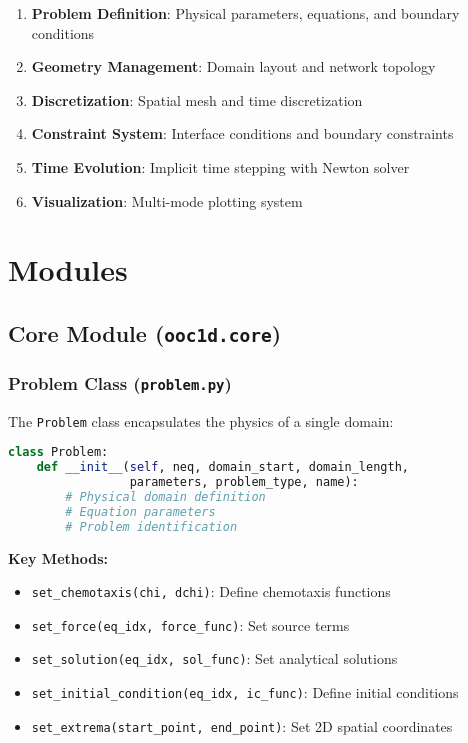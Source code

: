 \documentclass[11pt,a4paper]{article}
\newcommand{\code}[1]{\texttt{#1}}
\begin{document}
\begin{enumerate}
    \item \textbf{Problem Definition}: Physical parameters, equations, and boundary conditions
    \item \textbf{Geometry Management}: Domain layout and network topology
    \item \textbf{Discretization}: Spatial mesh and time discretization 
    \item \textbf{Constraint System}: Interface conditions and boundary constraints
    \item \textbf{Time Evolution}: Implicit time stepping with Newton solver
    \item \textbf{Visualization}: Multi-mode plotting system
\end{enumerate}

\section{Modules}

\subsection{Core Module (\code{ooc1d.core})}

\subsubsection{Problem Class (\code{problem.py})}

The \code{Problem} class encapsulates the physics of a single domain:

\begin{lstlisting}[language=Python, caption={Problem Class Structure}]
class Problem:
    def __init__(self, neq, domain_start, domain_length, 
                 parameters, problem_type, name):
        # Physical domain definition
        # Equation parameters
        # Problem identification
\end{lstlisting}

\textbf{Key Methods:}
\begin{itemize}
    \item \code{set\_chemotaxis(chi, dchi)}: Define chemotaxis functions
    \item \code{set\_force(eq\_idx, force\_func)}: Set source terms
    \item \code{set\_solution(eq\_idx, sol\_func)}: Set analytical solutions
    \item \code{set\_initial\_condition(eq\_idx, ic\_func)}: Define initial conditions
    \item \code{set\_extrema(start\_point, end\_point)}: Set 2D spatial coordinates
\end{itemize}
\end{document}

